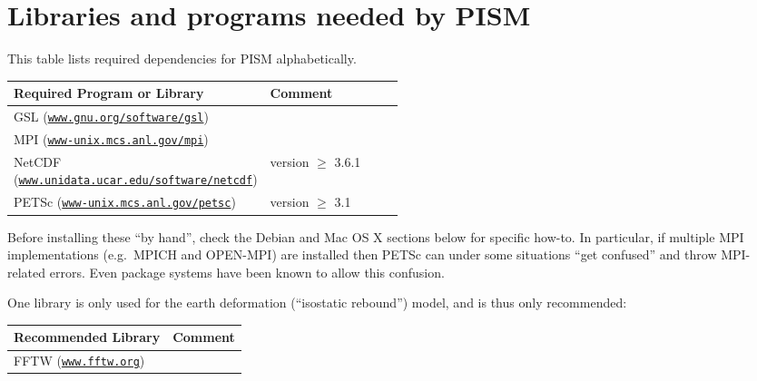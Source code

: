 \documentclass[11pt,final]{amsart}
\newcommand{\PETSCREL}{3.1}
\newcommand{\normalspacing}{\renewcommand{\baselinestretch}{1.1}\tiny\normalsize}
\renewcommand{\t}[1]{\texttt{#1}}
\begin{document}
\clearpage
\section{Libraries and programs needed by PISM}
\label{sec:prerequisites}

\bigskip
\normalspacing
This table lists required dependencies for PISM alphabetically.
\bigskip
\newcommand{\fattablespacing}{\renewcommand{\baselinestretch}{1.5}\tiny\normalsize}

\fattablespacing
\newcommand\pairstack[2]{#1 \quad (\small#2\normalsize)}
\begin{center}
\begin{tabular*}{1.0\linewidth}{lp{0.5\linewidth}}\toprule
  \textbf{Required Program or Library} & \textbf{Comment} \\
  \midrule
  \pairstack{GSL}{\href{http://www.gnu.org/software/gsl/}{\t{www.gnu.org/software/gsl}}}  &  \\
  \pairstack{MPI}{\href{http://www-unix.mcs.anl.gov/mpi/}{\t{www-unix.mcs.anl.gov/mpi}}}  & \\
  \pairstack{NetCDF}{\href{http://www.unidata.ucar.edu/software/netcdf/}{\t{www.unidata.ucar.edu/software/netcdf}}}  & version $\ge$ 3.6.1\\
  \pairstack{PETSc}{\href{http://www-unix.mcs.anl.gov/petsc/petsc-as/}{\t{www-unix.mcs.anl.gov/petsc}}}  & version $\ge$ \PETSCREL \\
  \bottomrule
\end{tabular*}
\end{center}

\normalspacing
\bigskip

Before installing these ``by hand'', check the Debian and Mac OS X sections below for specific how-to.  In particular, if multiple MPI implementations (e.g.~MPICH and OPEN-MPI) are installed then PETSc can under some situations ``get confused'' and throw MPI-related errors.  Even package systems have been known to allow this confusion.

One library is only used for the earth deformation (``isostatic rebound'') model, and is thus only recommended:
\bigskip

\fattablespacing
\begin{center}
\begin{tabular*}{1.0\linewidth}{ll}\toprule
  \textbf{Recommended Library} & \textbf{Comment} \\
  \midrule
  \pairstack{FFTW}{\href{http://www.fftw.org/}{\t{www.fftw.org}}}\hspace{1.9in} & \\
  \bottomrule
\end{tabular*}
\end{center}
\end{document}
